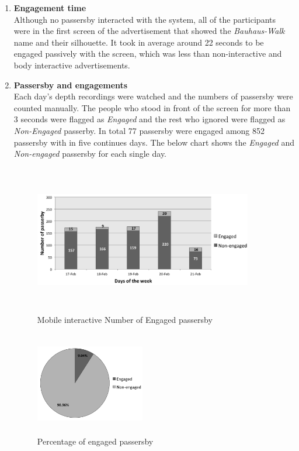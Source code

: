 \begin{enumerate}
\newpage
\item \textbf{Engagement time} \\
Although no passersby interacted with the system, all of the participants were in the first screen of the advertisement that showed the \emph{Bauhaus-Walk} name and their silhouette. It took in average around 22 seconds to be engaged passively with the screen, which was less than non-interactive and body interactive advertisements. 


\item \textbf{Passersby and engagements} \\
Each day’s depth recordings were watched and the numbers of passersby were counted manually. The people who stood in front of the screen for more than 3 seconds were flagged as \emph{Engaged} and the rest who ignored were flagged as \emph{Non-Engaged} passerby. In total 77 passersby were engaged among 852 passersby with in five continues days. The below chart shows the \emph{Engaged} and \emph{Non-engaged} passersby for each single day.
\begin{figure}[H]
    \centering
    \includegraphics[width=0.9\textwidth,height=6.5cm]{Figures/8/mobile_inter_findings/mobile_inter_engage_day}
    \caption{Mobile interactive Number of Engaged passersby}%
    \label{fig:mobileengagedandengagedby}%
\end{figure}


\begin{figure}[H]
    \centering
    \includegraphics[width=0.45\textwidth,height=4.5cm]{Figures/8/mobile_inter_findings/mobile_eng_percentage}
    \caption{Percentage of engaged passersby}%
    \label{fig:mobileengagedpasserbypercentage}%
\end{figure}


\end{enumerate}
